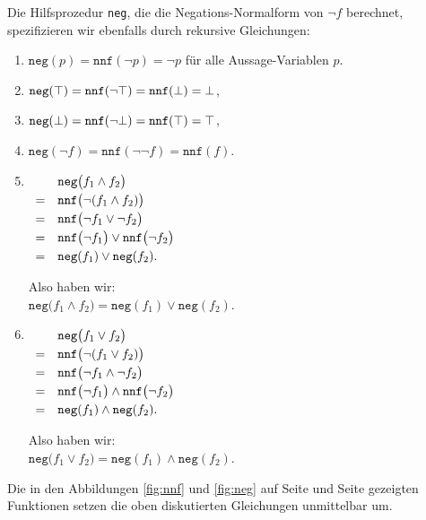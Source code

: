 Die Hilfsprozedur \texttt{neg}, die die Negations-Normalform von $\neg f$ berechnet,
spezifizieren wir ebenfalls durch rekursive Gleichungen: 
\begin{enumerate}
\item $\texttt{neg}(p) = \texttt{nnf}(\neg p) = \neg p$ für alle Aussage-Variablen $p$.
\item $\texttt{neg}(\top) = \texttt{nnf}(\neg\top) = \texttt{nnf}(\bot) = \bot$, 
\item $\texttt{neg}(\bot) = \texttt{nnf}(\neg\bot) = \texttt{nnf}(\top) = \top$,
\item $\texttt{neg}(\neg f) = \texttt{nnf}(\neg \neg f) = \texttt{nnf}(f)$.
\item $\begin{array}[t]{cl}
         & \texttt{neg}\bigl(f_1 \wedge f_2 \bigr) \\[0.1cm]
       = & \texttt{nnf}\bigl(\neg(f_1 \wedge f_2)\bigr) \\[0.1cm]
       = & \texttt{nnf}\bigl(\neg f_1 \vee \neg f_2\bigr) \\[0.1cm]
       = & \texttt{nnf}\bigl(\neg f_1\bigr) \vee \texttt{nnf}\bigl(\neg f_2\bigr) \\[0.1cm]
       = & \texttt{neg}(f_1) \vee \texttt{neg}(f_2).
       \end{array}
      $

      Also haben wir:
      \\[0.2cm]
      \hspace*{1.3cm}
      $\texttt{neg}\bigl(f_1 \wedge f_2 \bigr) = \texttt{neg}(f_1) \vee \texttt{neg}(f_2)$.
\item $\begin{array}[t]{cl}
         & \texttt{neg}\bigl(f_1 \vee f_2 \bigr)        \\[0.1cm]
       = & \texttt{nnf}\bigl(\neg(f_1 \vee f_2) \bigr)  \\[0.1cm]
       = & \texttt{nnf}\bigl(\neg f_1 \wedge \neg f_2 \bigr)  \\[0.1cm]
       = & \texttt{nnf}\bigl(\neg f_1\bigr) \wedge \texttt{nnf}\bigl(\neg f_2 \bigr)  \\[0.1cm]
       = & \texttt{neg}(f_1) \wedge \texttt{neg}(f_2). 
       \end{array}
      $

      Also haben wir: 
      \\[0.2cm]
      \hspace*{1.3cm}
      $\texttt{neg}\bigl(f_1 \vee f_2 \bigr) = \texttt{neg}(f_1) \wedge \texttt{neg}(f_2)$.
\end{enumerate}
Die in den Abbildungen \ref{fig:nnf} und \ref{fig:neg} auf Seite \pageref{fig:nnf} und Seite \pageref{fig:neg} gezeigten Funktionen setzen die oben diskutierten
Gleichungen unmittelbar um. 

